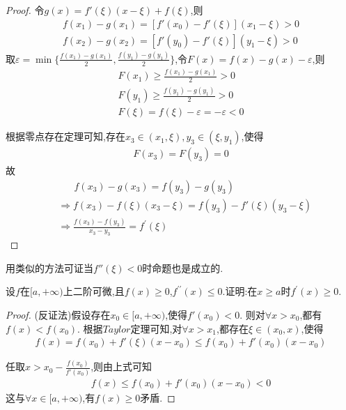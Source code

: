 \documentclass[lang=cn,newtx,10pt,scheme=chinese]{elegantbook}
\begin{document}
\begin{exercise}
\begin{proof}
    令$g(x)=f'(\xi)(x-\xi)+f(\xi)$,则
    \begin{gather}
        f(x_1)-g(x_1)=[f'(x_0)-f'(\xi)](x_1-\xi)>0
        \nonumber
        \\
        f(x_2)-g(x_2)=[f'(y_0)-f'(\xi)](y_1-\xi)>0
        \nonumber
    \end{gather}
    取$\varepsilon=\min\{\frac{f(x_1)-g(x_1)}{2},\frac{f(y_1)-g(y_1)}{2}\}$,令$F(x)=f(x)-g(x)-\varepsilon$,则
    \begin{gather}
    F(x_1)\geqslant \frac{f(x_1)-g(x_1)}{2}>0\nonumber
    \\
    F(y_1)\geqslant \frac{f(y_1)-g(y_1)}{2}>0
    \nonumber \\
    F(\xi)=f(\xi)-\varepsilon=-\varepsilon<0
        \nonumber
    \end{gather}

    根据零点存在定理可知,存在$x_3\in(x_1,\xi),y_3\in(\xi,y_1)$,使得
    \begin{gather}
    F(x_3)=F(y_3)=0
        \nonumber
    \end{gather}
    故
    \begin{equation}
        \begin{split}
        &\,\,\,\,\,\,\,\,\,\,f(x_3)-g(x_3)=f(y_3)-g(y_3)
        \nonumber
        \\
        &\Rightarrow f(x_3)-f(\xi)(x_3-\xi)=f(y_3)-f'(\xi)(y_3-\xi)
        \nonumber
        \\
        &\Rightarrow \frac{f(x_3)-f(y_3)}{x_3 - y_3}=f^{\prime}(\xi)
        \nonumber
    \end{split}
    \end{equation}
    \end{proof}
    \begin{remark}
        用类似的方法可证当$f''(\xi)<0$时命题也是成立的.
    \end{remark}
\end{exercise}

\begin{exercise}
设\(f\)在\([a,+\infty)\)上二阶可微,且\(f(x)\geq0\),\(f^{\prime\prime}(x)\leq0\).证明:在\(x\geq a\)时\(f^{\prime}(x)\geq0\).    
    \begin{proof}
        (反证法)假设存在$x_0\in[a,+\infty)$,使得$f'(x_0)<0$.
        则对$\forall x>x_0$,都有$f(x)<f(x_0)$.
        根据$Taylor$定理可知,对$\forall x>x_1$,都存在$\xi\in(x_0,x)$,使得
        \begin{gather}
            f(x)=f(x_0)+f'(\xi)(x-x_0)\leqslant f(x_0)+f'(x_0)(x-x_0)
            \nonumber
        \end{gather}
        
        任取$x>x_0-\frac{f(x_0)}{f'(x_0)}$,则由上式可知
        \begin{gather}
            f(x)\leqslant f(x_0)+f'(x_0)(x-x_0)<0
            \nonumber
        \end{gather}
        这与$\forall x\in[a,+\infty)$,有$f(x)\ge 0$矛盾.
    \end{proof}
\end{exercise}
\end{document}
